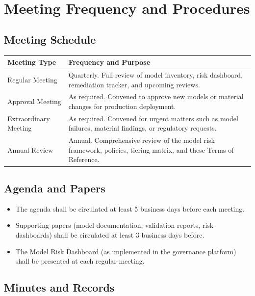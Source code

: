 \documentclass[11pt]{article}
\begin{document}
\section{Meeting Frequency and Procedures}

\subsection{Meeting Schedule}

\begin{longtable}{p{4cm}p{9.5cm}}
\toprule
\textbf{Meeting Type} & \textbf{Frequency and Purpose} \\
\midrule
\endhead
Regular Meeting & Quarterly. Full review of model inventory, risk dashboard,
                  remediation tracker, and upcoming reviews. \\[6pt]
Approval Meeting & As required. Convened to approve new models or material
                   changes for production deployment. \\[6pt]
Extraordinary Meeting & As required. Convened for urgent matters such as model
                        failures, material findings, or regulatory requests. \\[6pt]
Annual Review & Annual. Comprehensive review of the model risk framework,
                policies, tiering matrix, and these Terms of Reference. \\
\bottomrule
\end{longtable}

\subsection{Agenda and Papers}

\begin{itemize}
    \item The agenda shall be circulated at least 5 business days before each
          meeting.
    \item Supporting papers (model documentation, validation reports, risk
          dashboards) shall be circulated at least 3 business days before.
    \item The Model Risk Dashboard (as implemented in the governance platform)
          shall be presented at each regular meeting.
\end{itemize}

\subsection{Minutes and Records}
\end{document}
